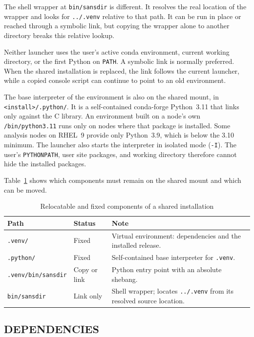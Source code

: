 \documentclass[tm]{ornltm}
\begin{document}
The shell wrapper at \texttt{bin/sansdir} is different. It resolves the real
location of the wrapper and looks for \texttt{../.venv} relative to that path.
It can be run in place or reached through a symbolic link, but copying the
wrapper alone to another directory breaks this relative lookup.

Neither launcher uses the user's active conda environment, current working
directory, or the first Python on \texttt{PATH}. A symbolic link is normally
preferred. When the shared installation is replaced, the link follows the
current launcher, while a copied console script can continue to point to an old
environment.

The base interpreter of the environment is also on the shared mount, in
\texttt{<install>/.python/}. It is a self-contained conda-forge Python~3.11 that
links only against the C library. An environment built on a node's own
\texttt{/bin/python3.11} runs only on nodes where that package is installed.
Some analysis nodes on RHEL~9 provide only Python~3.9, which is below the
3.10 minimum. The launcher also starts the interpreter in isolated mode
(\texttt{-I}). The user's \texttt{PYTHONPATH}, user site packages, and working
directory therefore cannot hide the installed packages.

Table~\ref{tab:portable} shows which components must remain on the shared mount
and which can be moved.

\begin{table}[ht]
  \centering
  \caption{Relocatable and fixed components of a shared installation}
  \label{tab:portable}
  \small
  \begin{tabular}{p{} p{} p{}}
    \toprule
    Path & Status & Note \\
    \midrule
    \texttt{.venv/} & Fixed & Virtual environment: dependencies and the
      installed release. \\
    \texttt{.python/} & Fixed & Self-contained base interpreter for
      \texttt{.venv}. \\
    \texttt{.venv/bin/sansdir} & Copy or link & Python entry point with an
      absolute shebang. \\
    \texttt{bin/sansdir} & Link only & Shell wrapper; locates
      \texttt{../.venv} from its resolved source location. \\
    \bottomrule
  \end{tabular}
\end{table}

\subsection{DEPENDENCIES}
\end{document}

